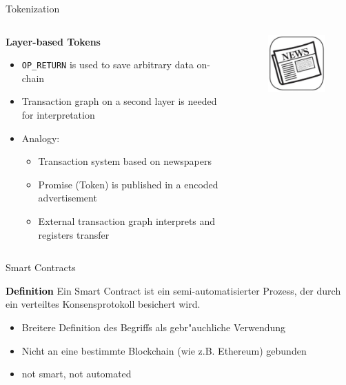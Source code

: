\documentclass[]{beamer}
\begin{document}
\begin{frame}{Tokenization}
	\begin{columns}
		\begin{column}{0.65\textwidth}
			\textbf{Layer-based Tokens}
			\begin{itemize}
				\item<1 -> \texttt{OP\_RETURN} is used to save arbitrary data on-chain 
				\item<2 -> Transaction graph on a second layer is needed for interpretation
				\item<3 -> Analogy:
				\begin{itemize}
					\item<4 -> Transaction system based on newspapers
					\item<4 -> Promise (Token) is published in a encoded advertisement
					\item<4 -> External transaction graph interprets and registers transfer
				\end{itemize}
			\end{itemize}
		\end{column}
		\begin{column}{0.4\textwidth}
			\begin{figure}
				\centering
				\includegraphics[width = 3.5cm]{../assets/images/newspaper.jpg}
			\end{figure}
		\end{column}
	\end{columns}
\end{frame}


\begin{frame}{Smart Contracts}
	\begin{block}{\textbf{\textcolor{black}{Definition}}}
		Ein Smart Contract ist ein semi-automatisierter Prozess, der durch ein verteiltes Konsensprotokoll besichert wird.
	\end{block}
	\begin{itemize}
		\item<2-> Breitere Definition des Begriffs als gebr"auchliche Verwendung
		\item<3-> Nicht an eine bestimmte Blockchain (wie z.B. Ethereum) gebunden
		\item<4-> not smart, not automated
	\end{itemize}
\end{frame}
\end{document}
